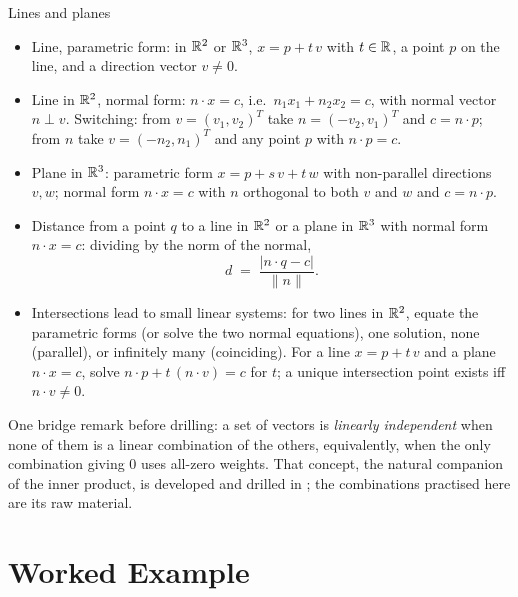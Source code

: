 \begin{rulebox}{Lines and planes}
\begin{itemize}[leftmargin=1.6em,itemsep=0.3ex]
  \item Line, parametric form: in $\mathbb{R}^{2}$ or
        $\mathbb{R}^{3}$, $x = p + t \, v$ with $t \in \mathbb{R}$, a point $p$ on the
        line, and a direction vector $v \neq 0$.
  \item Line in $\mathbb{R}^{2}$, normal form: $n \cdot x = c$,
        i.e.\ $n_{1} x_{1} + n_{2} x_{2} = c$, with normal vector
        $n \perp v$. Switching: from $v = (v_{1}, v_{2})^{T}$ take
        $n = (-v_{2}, v_{1})^{T}$ and $c = n \cdot p$; from $n$ take
        $v = (-n_{2}, n_{1})^{T}$ and any point $p$ with $n \cdot p = c$.
  \item Plane in $\mathbb{R}^{3}$: parametric form $x = p + s \, v + t \, w$ with
        non-parallel directions $v, w$; normal form $n \cdot x = c$ with
        $n$ orthogonal to both $v$ and $w$ and $c = n \cdot p$.
  \item Distance from a point $q$ to a line in $\mathbb{R}^{2}$ or a plane in
        $\mathbb{R}^{3}$ with normal form $n \cdot x = c$: dividing by the norm
        of the normal,
        \[
        d \;=\; \frac{|n \cdot q - c|}{\|n\|} .
        \]
  \item Intersections lead to small linear systems: for two lines in
        $\mathbb{R}^{2}$, equate the parametric forms (or solve the two normal
        equations), one solution, none (parallel), or infinitely many
        (coinciding). For a line $x = p + t \, v$ and a plane
        $n \cdot x = c$, solve $n \cdot p + t \, (n \cdot v) = c$ for
        $t$; a unique intersection point exists iff $n \cdot v \neq 0$.
\end{itemize}
\end{rulebox}

One bridge remark before drilling: a set of vectors is \emph{linearly
independent} when none of them is a linear combination of the others,
equivalently, when the only combination giving $0$ uses all-zero weights.
That concept, the natural companion of the inner product, is
developed and drilled in ; the combinations practised here are its
raw material.

\section{Worked Example}

